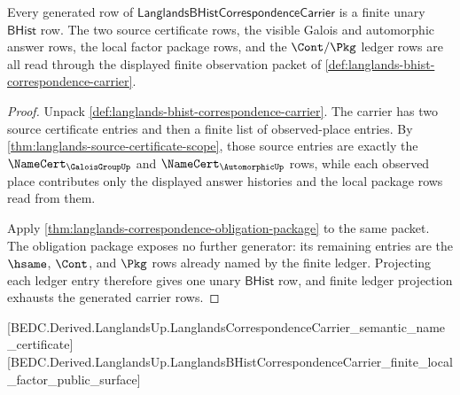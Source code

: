 \begin{theorem}
\label{thm:langlands-generated-rows-unary}
Every generated row of $\mathsf{LanglandsBHistCorrespondenceCarrier}$ is a finite unary $\mathsf{BHist}$ row. The two source certificate rows, the visible Galois and automorphic answer rows, the local factor package rows, and the $\Cont/\Pkg$ ledger rows are all read through the displayed finite observation packet of \autoref{def:langlands-bhist-correspondence-carrier}.
\end{theorem}
\begin{proof}
Unpack \autoref{def:langlands-bhist-correspondence-carrier}. The carrier has two source certificate entries and then a finite list of observed-place entries. By \autoref{thm:langlands-source-certificate-scope}, those source entries are exactly the $\NameCert_{\GaloisGroupUp}$ and $\NameCert_{\AutomorphicUp}$ rows, while each observed place contributes only the displayed answer histories and the local package rows read from them.

Apply \autoref{thm:langlands-correspondence-obligation-package} to the same packet. The obligation package exposes no further generator: its remaining entries are the $\hsame$, $\Cont$, and $\Pkg$ rows already named by the finite ledger. Projecting each ledger entry therefore gives one unary $\mathsf{BHist}$ row, and finite ledger projection exhausts the generated carrier rows.
\end{proof}

[BEDC.Derived.LanglandsUp.LanglandsCorrespondenceCarrier\_semantic\_name\_certificate]
[BEDC.Derived.LanglandsUp.LanglandsBHistCorrespondenceCarrier\_finite\_local\_factor\_public\_surface]

\begin{closurestatus}{\LanglandsUp}
  \theoryclosure{\publicClosure}
  \formalstatus{\axiomCleanV}
\end{closurestatus}
